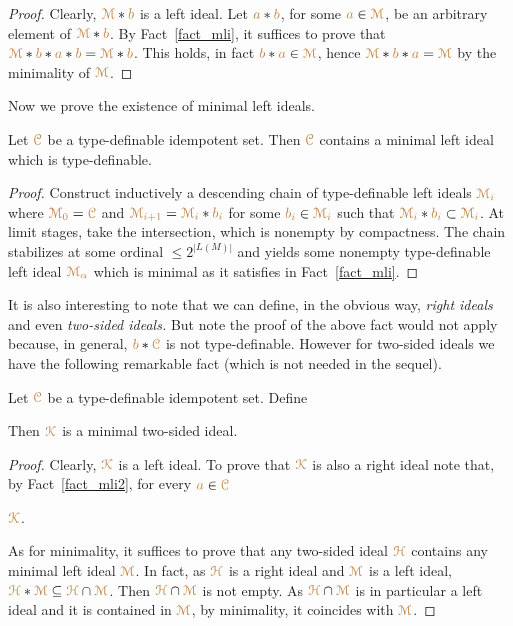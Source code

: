 \begin{proof}
  Clearly, ${\color{brown}\EuScript M}*{\color{brown} b}$ is a left ideal.
  Let ${\color{brown} a}*{\color{brown} b}$, for some ${\color{brown} a}\in{\color{brown}\EuScript M}$, be an arbitrary element of ${\color{brown}\EuScript M}*{\color{brown} b}$.
  By Fact~\ref{fact_mli}, it suffices to prove that ${\color{brown}\EuScript M}*{\color{brown} b}*{\color{brown} a}*{\color{brown} b}={\color{brown}\EuScript M}*{\color{brown} b}$.
  This holds, in fact ${\color{brown} b}*{\color{brown} a}\in{\color{brown}\EuScript M}$, hence ${\color{brown}\EuScript M}*{\color{brown} b}*{\color{brown} a}={\color{brown}\EuScript M}$ by the minimality of ${\color{brown}\EuScript M}$.
\end{proof}

Now we prove the existence of minimal left ideals.

\begin{fact}
  Let ${\color{brown}\EuScript C}$ be a type-definable idempotent set.
  Then ${\color{brown}\EuScript C}$ contains a minimal left ideal which is type-definable.
\end{fact}

\begin{proof}
  Construct inductively a descending chain of type-definable left ideals ${\color{brown}\EuScript M_i}$ where ${\color{brown}\EuScript M_0}={\color{brown}\EuScript C}$ and ${\color{brown}\EuScript M_{i+1}}={\color{brown}\EuScript M_i}*{\color{brown} b_i}$ for some ${\color{brown} b_i}\in{\color{brown}\EuScript M_i}$ such that ${\color{brown}\EuScript M_i}*{\color{brown} b_i}\subset{\color{brown}\EuScript M_i}$.
  At limit stages, take the intersection, which is nonempty by compactness.
  The chain stabilizes at some ordinal $\le2^{|L(M)|}$ and yields some nonempty type-definable left ideal ${\color{brown}\EuScript M_\alpha}$ which is minimal as it satisfies  in Fact~\ref{fact_mli}.
\end{proof}

It is also interesting to note that we can define, in the obvious way, \textit{right ideals\/} and even \textit{two-sided ideals.}
But note the proof of the above fact would not apply because, in general, ${\color{brown} b}*{\color{brown}\EuScript C}$ is not type-definable.
However for two-sided ideals we have the following remarkable fact (which is not needed in the sequel).

\begin{fact}\label{fact_two_sided_ideal}
  Let ${\color{brown}\EuScript C}$ be a type-definable idempotent set.
  Define \smallskip

  \smallskip

  Then ${\color{brown}\EuScript K}$ is a minimal two-sided ideal.
\end{fact}

\begin{proof}
  Clearly, ${\color{brown}\EuScript K}$ is a left ideal.
  To prove that ${\color{brown}\EuScript K}$ is also a right ideal note that, by Fact~\ref{fact_mli2}, for every ${\color{brown} a}\in{\color{brown}\EuScript C}$ 

  \medrel{\subseteq}${\color{brown}\EuScript K}$.\smallskip

  As for minimality, it suffices to prove that any two-sided ideal ${\color{brown}\EuScript H}$ contains any minimal left ideal ${\color{brown}\EuScript M}$.
  In fact, as ${\color{brown}\EuScript H}$ is a right ideal and ${\color{brown}\EuScript M}$ is a left ideal, ${\color{brown}\EuScript H}*{\color{brown}\EuScript M}\subseteq{\color{brown}\EuScript H}\cap{\color{brown}\EuScript M}$.
  Then ${\color{brown}\EuScript H}\cap{\color{brown}\EuScript M}$ is not empty.
  As ${\color{brown}\EuScript H}\cap{\color{brown}\EuScript M}$ is in particular a left ideal and it is contained in ${\color{brown}\EuScript M}$, by minimality, it coincides with ${\color{brown}\EuScript M}$.
\end{proof}


